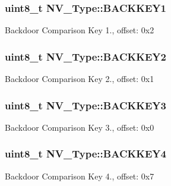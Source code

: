 \subsubsection[{\texorpdfstring{B\+A\+C\+K\+K\+E\+Y1}{BACKKEY1}}]{ uint8\+\_\+t N\+V\+\_\+\+Type\+::\+B\+A\+C\+K\+K\+E\+Y1}\hypertarget{structNV__Type_ad90570e3331407893b892cd722c8566c}{}\label{structNV__Type_ad90570e3331407893b892cd722c8566c}
Backdoor Comparison Key 1., offset\+: 0x2 
\subsubsection[{\texorpdfstring{B\+A\+C\+K\+K\+E\+Y2}{BACKKEY2}}]{ uint8\+\_\+t N\+V\+\_\+\+Type\+::\+B\+A\+C\+K\+K\+E\+Y2}\hypertarget{structNV__Type_ab01f94708b68f34fd5b40a18b21c6d76}{}\label{structNV__Type_ab01f94708b68f34fd5b40a18b21c6d76}
Backdoor Comparison Key 2., offset\+: 0x1 
\subsubsection[{\texorpdfstring{B\+A\+C\+K\+K\+E\+Y3}{BACKKEY3}}]{ uint8\+\_\+t N\+V\+\_\+\+Type\+::\+B\+A\+C\+K\+K\+E\+Y3}\hypertarget{structNV__Type_a99c28a1d24b507ca392b62abd7326c22}{}\label{structNV__Type_a99c28a1d24b507ca392b62abd7326c22}
Backdoor Comparison Key 3., offset\+: 0x0 
\subsubsection[{\texorpdfstring{B\+A\+C\+K\+K\+E\+Y4}{BACKKEY4}}]{ uint8\+\_\+t N\+V\+\_\+\+Type\+::\+B\+A\+C\+K\+K\+E\+Y4}\hypertarget{structNV__Type_a0bc51ff64f2fe752028b0cf769f95f66}{}\label{structNV__Type_a0bc51ff64f2fe752028b0cf769f95f66}
Backdoor Comparison Key 4., offset\+: 0x7 

